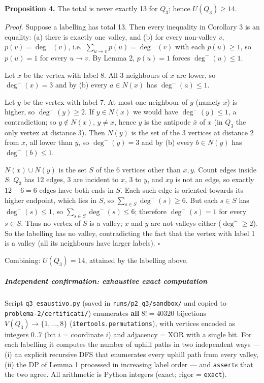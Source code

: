 \textbf{Proposition 4.} The total is never exactly 13 for \(Q_3\); hence
\(U(Q_3)\ge 14\).

\emph{Proof.} Suppose a labelling has total 13. Then every inequality in
Corollary 3 is an equality: (a) there is exactly one valley, and (b) for
every non-valley \(v\), \(p(v)=\deg^-(v)\),
i.e.~\(\sum_{u\to v}p(u)=\deg^-(v)\) with each \(p(u)\ge1\), so
\(p(u)=1\) for every \(u\to v\). By Lemma 2, \(p(u)=1\) forces
\(\deg^-(u)\le1\).

Let \(x\) be the vertex with label 8. All 3 neighbours of \(x\) are
lower, so \(\deg^-(x)=3\) and by (b) every \(a\in N(x)\) has
\(\deg^-(a)\le1\).

Let \(y\) be the vertex with label 7. At most one neighbour of \(y\)
(namely \(x\)) is higher, so \(\deg^-(y)\ge2\). If \(y\in N(x)\) we
would have \(\deg^-(y)\le1\), a contradiction; so \(y\notin N(x)\),
\(y\ne x\), hence \(y\) is the antipode \(\bar x\) of \(x\) (in \(Q_3\)
the only vertex at distance 3). Then \(N(y)\) is the set of the 3
vertices at distance 2 from \(x\), all lower than \(y\), so
\(\deg^-(y)=3\) and by (b) every \(b\in N(y)\) has \(\deg^-(b)\le1\).

\(N(x)\cup N(y)\) is the set \(S\) of the 6 vertices other than \(x,y\).
Count edges inside \(S\): \(Q_3\) has 12 edges, 3 are incident to \(x\),
3 to \(y\), and \(xy\) is not an edge, so exactly \(12-6=6\) edges have
both ends in \(S\). Each such edge is oriented towards its higher
endpoint, which lies in \(S\), so \(\sum_{s\in S}\deg^-(s)\ge 6\). But
each \(s\in S\) has \(\deg^-(s)\le1\), so
\(\sum_{s\in S}\deg^-(s)\le6\); therefore \(\deg^-(s)=1\) for every
\(s\in S\). Thus no vertex of \(S\) is a valley; \(x\) and \(y\) are not
valleys either (\(\deg^-\ge2\)). So the labelling has no valley,
contradicting the fact that the vertex with label 1 is a valley (all its
neighbours have larger labels). \(\square\)

Combining: \(U(Q_3)=14\), attained by the labelling above.

\subparagraph{Independent confirmation: exhaustive exact
computation}\label{independent-confirmation-exhaustive-exact-computation}

Script \texttt{q3\_esaustivo.py} (saved in \texttt{runs/p2\_q3/sandbox/}
and copied to \texttt{problema-2/certificati/}) enumerates \textbf{all}
\(8!=40320\) bijections \(V(Q_3)\to\{1,\dots,8\}\)
(\texttt{itertools.permutations}), with vertices encoded as integers
\(0..7\) (bit \(i\) = coordinate \(i\)) and adjacency = XOR with a
single bit. For each labelling it computes the number of uphill paths in
two independent ways --- (i) an explicit recursive DFS that enumerates
every uphill path from every valley, (ii) the DP of Lemma 1 processed in
increasing label order --- and \texttt{assert}s that the two agree. All
arithmetic is Python integers (exact; rigor = \texttt{exact}).

